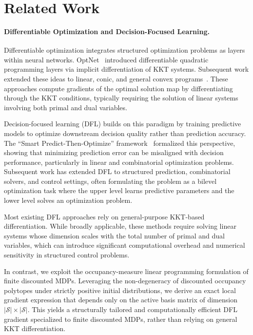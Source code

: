 \section{Related Work}

\paragraph{Differentiable Optimization and Decision-Focused Learning.}

Differentiable optimization integrates structured optimization problems as layers within neural networks. OptNet~\cite{amos2017optnet} introduced differentiable quadratic programming layers via implicit differentiation of KKT systems. Subsequent work extended these ideas to linear, conic, and general convex programs~\cite{agrawal2019differentiable, gould2016deep}. These approaches compute gradients of the optimal solution map by differentiating through the KKT conditions, typically requiring the solution of linear systems involving both primal and dual variables.

Decision-focused learning (DFL) builds on this paradigm by training predictive models to optimize downstream decision quality rather than prediction accuracy. The ``Smart Predict-Then-Optimize'' framework~\cite{elmachtoub2022smart} formalized this perspective, showing that minimizing prediction error can be misaligned with decision performance, particularly in linear and combinatorial optimization problems. Subsequent work has extended DFL to structured prediction, combinatorial solvers, and control settings, often formulating the problem as a bilevel optimization task where the upper level learns predictive parameters and the lower level solves an optimization problem.

Most existing DFL approaches rely on general-purpose KKT-based differentiation. While broadly applicable, these methods require solving linear systems whose dimension scales with the total number of primal and dual variables, which can introduce significant computational overhead and numerical sensitivity in structured control problems.

In contrast, we exploit the occupancy-measure linear programming formulation of finite discounted MDPs. Leveraging the non-degeneracy of discounted occupancy polytopes under strictly positive initial distributions, we derive an exact local gradient expression that depends only on the active basis matrix of dimension $|\mathcal{S}| \times |\mathcal{S}|$. This yields a structurally tailored and computationally efficient DFL gradient specialized to finite discounted MDPs, rather than relying on general KKT differentiation.

